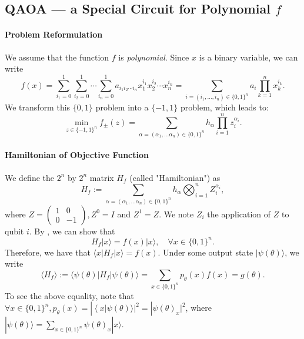 \documentclass[
        11pt, %
	a4paper, %
]{LegrandOrangeBook}
\begin{document}
\subsection{QAOA --- a Special Circuit for Polynomial $f$}

\paragraph{Problem Reformulation}
We assume that the function $f$ is \textit{polynomial}. Since $x$ is a binary variable, we can write
\begin{equation}
    f(x)
=\sum_{i_1=0}^1 \sum_{i_2=0}^1 \cdots \sum_{i_n=0}^1 a_{i_1 i_2 \cdots i_n} x_1^{i_1} x_2^{i_2} \cdots x_n^{i_n}
=\sum_{i=\left(i_1, \ldots ,i_n\right) \in\{0,1\}^n} a_i \prod_{k=1}^n x_k^{i_k}.
\end{equation}
We transform this $\{0,1\}$ problem into a $\{-1,1\}$ problem, which leads to:
\begin{equation}
    \min _{z \in\{-1,1\}^{n}} f_{ \pm}(z)=\sum_{\alpha=\left(\alpha_{1}, \ldots \alpha_{n}\right) \in\{0,1\}^{n}} h_{\alpha} \prod_{i=1}^{n} z_{i}^{\alpha_{i}}.
\end{equation}
\paragraph{Hamiltonian of Objective Function}
We define the $2^n$ by $2^n$ matrix $H_{f}$ (called "Hamiltonian") as
\begin{equation}
    H_{f}:=\sum_{\alpha=\left(\alpha_{1}, \ldots \alpha_{n}\right) \in\{0,1\}^{n}} h_{\alpha} \bigotimes_{i=1}^{n} Z_{i}^{\alpha_{i}},
\end{equation}
where $Z=\left(\begin{array}{cc}1 & 0 \\ 0 & -1\end{array}\right), Z^{0}=I$ and $Z^{1}=Z$. We note $Z_{i}$ the application of $Z$ to qubit $i$. By \cite[Proposition 32]{grange2023introduction}, we can show that 
\begin{equation}
    H_{f}|x\rangle=f(x)|x\rangle, \quad \forall x \in \{0,1\}^{n}.
\end{equation}
Therefore, we have that $\langle x | H_{f}|x\rangle=f(x)$. Under some output state $|\psi(\theta)\rangle$, we write
\begin{equation}
    \langle H_{f} \rangle := \langle \psi(\theta)| H_{f}|\psi(\theta)\rangle =\sum_{x \in\{0,1\}^n} p_\theta(x) f(x)= g(\theta).
\end{equation}
To see the above equality, note that $\forall x \in\{0,1\}^n, p_\theta(x)=|\left\langle x| \psi(\theta)\rangle\right|^2=|\psi(\theta)_x|^2$, where $| \psi(\theta)\rangle= \sum_{x \in\{0,1\}^n} \psi(\theta)_x | x\rangle$.
\end{document}
